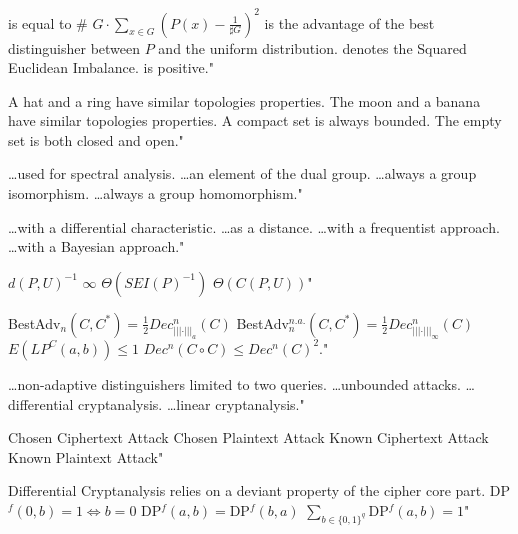 {is equal to \# $G\cdot\displaystyle\sum_{x\in G}\left(P(x)-\frac{1}{\sharp G}\right)^2$}
{is the advantage of the best distinguisher between $P$ and the uniform distribution.}
{denotes the Squared Euclidean Imbalance.}
{is positive."}

{A hat and a ring have similar topologies properties.}
{The moon and a banana have similar topologies properties.}
{A compact set is always bounded.}
{The empty set is both closed and open."}

{\ldots used for spectral analysis.}
{\ldots an element of the dual group.}
{\ldots always a group isomorphism.}
{\ldots always a group homomorphism."}

{\ldots with a differential characteristic.}
{\ldots as a distance.}
{\ldots with a frequentist approach.}
{\ldots with a Bayesian approach."}

{$d(P,U)^{-1}$}
{$\infty$}
{$\Theta(SEI(P)^{-1})$}
{$\Theta(C(P,U))$"}

{BestAdv$_n(C,C^\ast)=\frac{1}{2}Dec^n_{\left|\left|\left|\cdot\right|\right|\right|_a}(C)$}
{BestAdv$_n^{n.a.}(C,C^\ast)=\frac{1}{2}Dec^n_{\left|\left|\left|\cdot\right|\right|\right|_\infty}(C)$}
{$E(LP^{C}(a,b))\leq 1$}
{$Dec^n(C\circ C)\leq Dec^n(C)^2$."}

{\ldots non-adaptive distinguishers limited to two queries.}
{\ldots unbounded attacks.}
{\ldots differential cryptanalysis.}
{\ldots linear cryptanalysis."}

{Chosen Ciphertext Attack}
{Chosen Plaintext Attack}
{Known Ciphertext Attack}
{Known Plaintext Attack"}

{Differential Cryptanalysis relies on a deviant property of the cipher core part.}
{DP$^f(0,b)=1\Leftrightarrow b=0$}
{DP$^f(a,b)=$DP$^f(b,a)$}
{$\displaystyle\sum_{b\in \{0,1\}^q}$DP$^f(a,b)=1$"}

